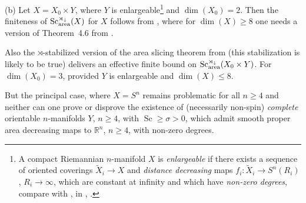 \documentclass[10pt,a4paper]{amsart}
\numberwithin{equation}{section}
\begin{document}
 (b) Let $X=X_0\times Y$, where $Y$ is
 enlargeable\footnote{A compact Riemannian $n$-manifold $X$ is \emph{enlargeable} if there exists a sequence of oriented coverings
 $\tilde X_i\to X$ and {\it distance decreasing} maps
 $f_i\colon \tilde X_i\to S^n(R_i)$, $R_i\to \infty$, which are constant at infinity and which have {\it non-zero degrees}, compare with \cite{BH2009, GL1980, HKRS, SY1979}, in \cite[\S4.7]{Gr2021}, \cite[\S2.A]{Gr2023}.} and $\dim(X_0)=2$.
Then the finiteness of $\operatorname{Sc}_{\rm area}^{\rtimes_\downarrow}(X)$ for $X$ follows from \cite{Zhu2020}, where for $\dim(X)\geq 8$ one needs a version of Theorem~4.6 from \cite{SY2017}.

Also the
 $\rtimes$-stabilized version of the area slicing theorem from \cite{LM2021} (this stabilization is likely to be true) delivers an effective finite bound on $\operatorname{Sc}_{\rm area}^{\rtimes_\downarrow}(X_0\times Y)$.
For $\dim(X_0) =3$, provided $Y$ is enlargeable and $\dim(X)\leq 8$.

 But the principal case, where $X=S^n$ remains problematic for all $n\geq 4$
 and neither can one prove or disprove the existence of (necessarily non-spin) {\it complete} orientable $n$-manifolds $Y$, $n\geq 4$, with $\operatorname{Sc}\geq \sigma>0$,
which admit smooth proper area decreasing maps to $\mathbb R^n$, $n\geq 4$, with non-zero degrees.
\end{document}
